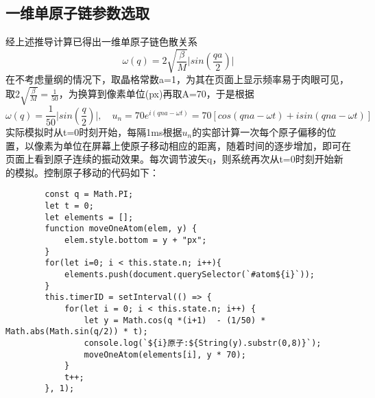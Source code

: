 \documentclass[UTF8]{article}
\begin{document}
\subsection{一维单原子链参数选取}
经上述推导计算已得出一维单原子链色散关系$$\omega(q)=2\sqrt{\frac{\beta}{M}}\vert{sin(\frac{qa}{2})}\vert$$在不考虑量纲的情况下，取晶格常数a=1，为其在页面上显示频率易于肉眼可见，取$2\sqrt{\frac{\beta}{M}}=\frac{1}{50}$，为换算到像素单位(px)再取A=70，于是根据$$\omega(q)=\frac{1}{50}\vert{sin(\frac{q}{2})}\vert,\quad u_n=70e^{i(qna-\omega t)}=70[cos(qna-\omega t)+isin(qna-\omega t)]$$实际模拟时从t=0时刻开始，每隔1ms根据$u_n$的实部计算一次每个原子偏移的位置，以像素为单位在屏幕上使原子移动相应的距离，随着时间的逐步增加，即可在页面上看到原子连续的振动效果。每次调节波矢q，则系统再次从t=0时刻开始新的模拟。控制原子移动的代码如下：
\begin{lstlisting}
        const q = Math.PI;
        let t = 0;
        let elements = [];
        function moveOneAtom(elem, y) {
            elem.style.bottom = y + "px";
        }
        for(let i=0; i < this.state.n; i++){
            elements.push(document.querySelector(`#atom${i}`));
        }
        this.timerID = setInterval(() => {
            for(let i = 0; i < this.state.n; i++) {
                let y = Math.cos(q *(i+1)  - (1/50) * Math.abs(Math.sin(q/2)) * t);
                console.log(`${i}原子:${String(y).substr(0,8)}`);
                moveOneAtom(elements[i], y * 70);
            }
            t++;
        }, 1);
\end{lstlisting}
\end{document}
